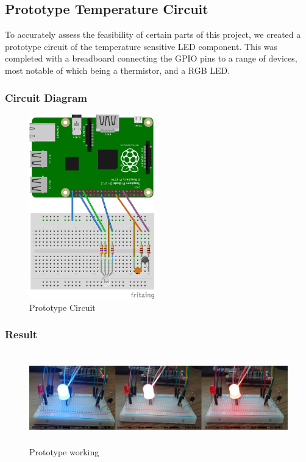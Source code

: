 \documentclass[10pt]{article}
\begin{document}
\newpage
\subsection{Prototype Temperature Circuit}
To accurately assess the feasibility of certain parts of this project, we created a prototype circuit of the temperature sensitive LED component. This was completed with a breadboard connecting the GPIO pins to a range of devices, most notable of which being a thermistor, and a RGB LED.

\subsubsection{Circuit Diagram}
\begin{figure}[h]
\centering
\caption{Prototype Circuit}
\label{Prototype Circuit}
\includegraphics[height=8cm]{images/prototypeDiagram.png}
\end{figure}

\subsubsection{Result}
\begin{figure}[h]
\centering
\caption{Prototype working}
\label{Prototype working}
\includegraphics[height=4cm]{images/tempsenproto.png}
\end{figure}
\pagebreak
\end{document}
